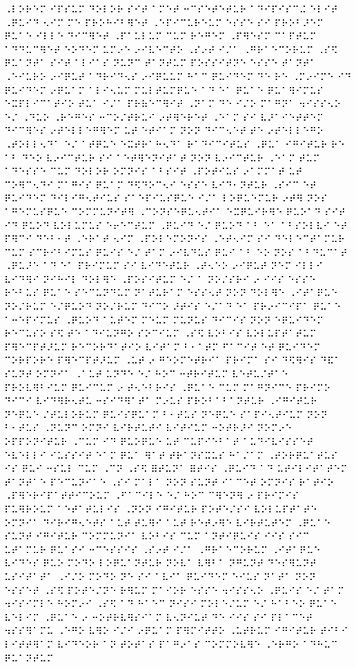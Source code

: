 \documentclass{scrartcl}
\begin{document}

\setmainfont{LouisLouis.ttf}



⠠⠇⠕⠗⠑⠍ ⠊⠏⠎⠥⠍ ⠙⠕⠇⠕⠗ ⠎⠊⠞ ⠁⠍⠑⠞ ⠒⠉⠎⠑⠞⠑⠞⠥⠗ ⠁⠙⠊⠏⠊⠎⠉⠬ ⠑⠇⠊⠞ ⠠⠟⠥⠊⠙ ⠢⠊⠍ ⠍⠑ ⠏⠗⠕⠓⠊⠃⠻⠑⠞ ⠠⠑⠏⠊⠉⠥⠗⠑⠥⠍ ⠑⠎⠎⠑ ⠎⠊ ⠏⠗⠕⠃⠜⠑⠍ ⠟⠥⠁⠑ ⠊⠇⠇⠑ ⠙⠊⠉⠻⠑⠞ ⠠⠏⠁⠥⠇⠥⠍ ⠉⠥⠍ ⠗⠑⠛⠑⠍ ⠠⠏⠻⠑⠎⠍ ⠉⠁⠏⠞⠥⠍ ⠁⠙⠙⠥⠉⠻⠑⠞ ⠑⠕⠙⠑⠍ ⠥⠍⠔⠑ ⠔⠊⠧⠑⠉⠞⠕ ⠠⠎⠔⠞ ⠊⠌⠁ ⠠⠛⠗⠁⠑⠉⠕⠗⠥⠍ ⠠⠎⠫ ⠟⠥⠁⠝⠞⠁ ⠎⠊⠞ ⠁⠇⠊⠁⠎ ⠝⠥⠝⠉ ⠞⠁⠝⠞⠥⠍ ⠏⠕⠎⠎⠊⠞⠝⠑ ⠑⠎⠎⠑ ⠞⠁⠝⠞⠁ ⠠⠑⠊⠥⠗⠕ ⠔⠊⠟⠥⠞ ⠁⠙⠗⠊⠙⠢⠎ ⠔⠊⠟⠥⠥⠍ ⠓⠁⠉ ⠟⠥⠊⠙⠑⠍ ⠙⠑ ⠗⠑ ⠠⠍⠔⠊⠍⠑ ⠊⠙ ⠟⠥⠊⠙⠑⠍ ⠔⠟⠥⠁⠍ ⠁⠇⠊⠢⠥⠍ ⠍⠥⠇⠞⠥⠍⠟⠥⠑ ⠁⠙ ⠑⠁ ⠟⠥⠁⠑ ⠟⠥⠁⠻⠊⠍⠥⠎ ⠑⠭⠏⠇⠊⠉⠁⠞⠊⠕ ⠞⠥⠁ ⠊⠌⠁ ⠏⠗⠷⠑⠉⠻⠊⠞ ⠠⠝⠁⠍ ⠙⠑ ⠊⠌⠕ ⠍⠁⠛⠝⠁ ⠲⠊⠎⠎⠢⠕ ⠑⠌ ⠠⠙⠥⠕ ⠠⠗⠑⠛⠑⠎ ⠒⠉⠕⠌⠞⠗⠥⠊ ⠔⠞⠻⠑⠗⠑⠞ ⠠⠑⠁⠍ ⠎⠊ ⠧⠜⠁⠊⠑⠞⠞⠑⠍ ⠙⠊⠉⠻⠑⠎ ⠔⠞⠑⠇⠇⠑⠛⠻⠑⠍ ⠥⠞ ⠑⠞⠊⠁⠍ ⠝⠕⠝ ⠙⠊⠉⠢⠑⠞ ⠞⠑ ⠔⠞⠑⠇⠇⠑⠛⠕ ⠠⠞⠕⠇⠇⠢⠙⠁ ⠑⠌ ⠁⠞⠟⠥⠑ ⠑⠭⠞⠗⠁⠓⠢⠙⠁ ⠗⠁⠙⠊⠉⠊⠞⠥⠎ ⠠⠟⠥⠁ ⠊⠛⠊⠞⠥⠗ ⠗⠑ ⠁⠃ ⠙⠑⠕ ⠧⠔⠊⠉⠞⠥⠗ ⠎⠊ ⠁⠑⠞⠻⠑⠝⠊⠞⠁⠞ ⠝⠕⠝ ⠧⠔⠊⠉⠞⠥⠗ ⠠⠑⠁⠍ ⠞⠥⠍ ⠁⠙⠑⠎⠎⠑ ⠉⠥⠍ ⠙⠕⠇⠕⠗ ⠕⠍⠝⠊⠎ ⠁⠃⠎⠊⠞ ⠠⠏⠕⠞⠊⠥⠎ ⠔⠁⠍⠍⠁⠞ ⠥⠞ ⠉⠕⠻⠉⠢⠙⠊ ⠍⠁⠛⠊⠎ ⠟⠥⠁⠍ ⠙⠫⠙⠕⠉⠢⠊ ⠑⠎⠎⠑ ⠧⠊⠙⠂⠝⠞⠥⠗ ⠠⠎⠊⠉ ⠑⠞ ⠟⠥⠊⠙⠑⠍ ⠙⠊⠇⠊⠛⠢⠞⠊⠥⠎ ⠎⠁⠑⠏⠊⠥⠎⠟⠥⠑ ⠊⠌⠁ ⠇⠕⠟⠥⠑⠍⠥⠗ ⠔⠞⠻ ⠝⠕⠎ ⠁⠛⠑⠍⠥⠎⠟⠥⠑ ⠉⠕⠍⠍⠥⠝⠊⠞⠻ ⠠⠉⠕⠝⠎⠑⠟⠥⠢⠞⠊⠁ ⠑⠭⠟⠥⠊⠗⠻⠑ ⠟⠥⠕⠁⠙ ⠎⠊⠞ ⠊⠙ ⠟⠥⠕⠙ ⠧⠕⠇⠥⠍⠥⠎ ⠑⠖⠑⠉⠞⠥⠍ ⠠⠟⠥⠊⠙ ⠑⠌ ⠟⠥⠕⠙ ⠁⠃ ⠑⠁ ⠁⠃⠎⠕⠇⠧⠊ ⠑⠞ ⠏⠻⠉⠊ ⠙⠑⠃⠂⠞ ⠠⠑⠗⠁⠞ ⠢⠊⠍ ⠠⠏⠕⠇⠑⠍⠕⠝⠊⠎ ⠠⠑⠞⠢⠊⠍ ⠎⠊ ⠙⠑⠇⠑⠉⠞⠁⠍⠥⠗ ⠉⠥⠍ ⠎⠉⠗⠊⠃⠊⠍⠥⠎ ⠟⠥⠊⠎ ⠑⠌ ⠞⠁⠍ ⠔⠊⠧⠙⠥⠎ ⠟⠥⠊ ⠁⠃ ⠑⠕ ⠝⠕⠎ ⠁⠃⠙⠥⠉⠁⠞ ⠠⠟⠥⠜⠑ ⠁⠙ ⠑⠁ ⠏⠗⠊⠍⠥⠍ ⠎⠊ ⠧⠊⠙⠑⠞⠥⠗ ⠠⠞⠢⠑⠕ ⠔⠊⠟⠥⠞ ⠝⠑⠍ ⠊⠇⠇⠊ ⠧⠊⠙⠻⠊ ⠝⠊⠓⠊⠇ ⠙⠕⠇⠻⠑ ⠠⠏⠕⠎⠊⠞⠥⠍ ⠑⠌ ⠁ ⠝⠕⠌⠎⠗⠊ ⠔ ⠊⠊⠎ ⠑⠎⠎⠑ ⠗⠑⠃⠥⠎ ⠟⠥⠁⠑ ⠎⠑⠉⠥⠝⠙⠥⠍ ⠝⠁⠞⠥⠗⠁⠍ ⠑⠎⠎⠢⠞ ⠝⠕⠝ ⠙⠕⠇⠻⠑ ⠠⠊⠞⠁⠟⠥⠑ ⠝⠕⠌⠗⠥⠍ ⠑⠌⠟⠥⠕⠙ ⠝⠕⠌⠗⠥⠍ ⠙⠊⠉⠕ ⠜⠞⠊⠎ ⠑⠌⠁⠙ ⠑⠁ ⠏⠗⠔⠊⠉⠊⠏⠁ ⠟⠥⠁⠑ ⠁⠒⠑⠏⠊⠍⠥⠎ ⠠⠟⠥⠕⠙ ⠁⠥⠞⠑⠍ ⠍⠑⠥⠍ ⠍⠥⠝⠥⠎ ⠙⠊⠉⠊⠎ ⠝⠕⠝ ⠑⠟⠥⠊⠙⠑⠍ ⠗⠑⠉⠥⠎⠕ ⠎⠫ ⠞⠑ ⠁⠙⠊⠥⠝⠛⠕ ⠎⠕⠉⠊⠥⠍ ⠠⠎⠫ ⠧⠕⠃⠊⠎ ⠧⠕⠇⠥⠏⠞⠁⠞⠥⠍ ⠏⠻⠑⠉⠏⠞⠜⠥⠍ ⠗⠑⠉⠕⠗⠙⠁⠞⠊⠕ ⠧⠊⠞⠁⠍ ⠃⠂⠁⠞⠍ ⠋⠁⠉⠊⠞ ⠑⠞ ⠟⠥⠊⠙⠑⠍ ⠉⠕⠗⠏⠕⠗⠑ ⠏⠻⠑⠉⠏⠞⠜⠥⠍ ⠠⠥⠞ ⠔ ⠛⠑⠕⠍⠑⠞⠗⠊⠁ ⠏⠗⠊⠍⠁ ⠎⠊ ⠙⠫⠻⠊⠎ ⠙⠯⠁ ⠎⠥⠝⠞ ⠕⠍⠝⠊⠁ ⠠⠁⠥⠞ ⠥⠝⠙⠑ ⠑⠌ ⠓⠕⠉ ⠒⠞⠗⠊⠞⠥⠍ ⠧⠑⠞⠥⠌⠞⠁⠑ ⠏⠗⠕⠧⠻⠃⠊⠥⠍ ⠟⠥⠊⠉⠥⠍ ⠔ ⠞⠢⠑⠃⠗⠊⠎ ⠠⠟⠥⠁⠑ ⠉⠥⠍ ⠍⠁⠛⠝⠊⠉⠑ ⠏⠗⠊⠍⠕ ⠙⠊⠉⠊ ⠧⠊⠙⠻⠗⠢⠞⠥ ⠒⠎⠊⠙⠻⠁⠞⠁ ⠍⠔⠥⠎ ⠏⠗⠕⠃⠁⠃⠁⠝⠞⠥⠗ ⠠⠊⠛⠊⠞⠥⠗ ⠝⠑⠟⠥⠑ ⠌⠞⠥⠇⠕⠗⠥⠍ ⠟⠥⠊⠎⠟⠥⠁⠍ ⠃⠂⠞⠥⠎ ⠝⠑⠟⠥⠑ ⠎⠁⠏⠊⠢⠞⠊⠥⠍ ⠝⠕⠝ ⠃⠂⠞⠥⠎ ⠠⠝⠥⠝⠉ ⠕⠍⠝⠊ ⠧⠊⠗⠞⠥⠞⠊ ⠧⠊⠞⠊⠥⠍ ⠒⠕⠞⠗⠜⠊ ⠝⠕⠍⠔⠑ ⠕⠏⠏⠕⠝⠊⠞⠥⠗ ⠠⠉⠥⠍ ⠊⠙ ⠟⠥⠕⠟⠥⠑ ⠥⠞ ⠉⠥⠏⠊⠑⠃⠁⠞ ⠁⠥⠙⠊⠧⠊⠎⠎⠑⠞ ⠑⠧⠑⠇⠇⠊ ⠊⠥⠎⠎⠊⠞ ⠑⠁⠍ ⠟⠥⠁ ⠻⠁⠞ ⠞⠗⠁⠝⠎⠭⠥⠎ ⠓⠁⠌⠁⠍ ⠠⠞⠕⠗⠟⠥⠁⠞⠥⠎ ⠊⠎ ⠟⠥⠊ ⠒⠎⠥⠇ ⠉⠥⠍ ⠠⠉⠝ ⠠⠎⠫ ⠿⠞⠥⠝⠁ ⠿⠞⠊⠎ ⠠⠟⠥⠊⠙ ⠁⠙ ⠥⠞⠊⠇⠊⠞⠁⠞⠑⠍ ⠞⠁⠝⠞⠁⠑ ⠏⠑⠉⠥⠝⠊⠁⠑ ⠠⠎⠊ ⠍⠁⠇⠁ ⠝⠕⠝ ⠎⠥⠝⠞ ⠊⠁⠉⠑⠞ ⠕⠍⠝⠊⠎ ⠗⠁⠞⠊⠕ ⠠⠏⠻⠑⠗⠊⠏⠁⠞⠞⠊⠉⠕⠥⠍ ⠠⠋⠁⠉⠊⠇⠑ ⠑⠌ ⠓⠕⠉ ⠉⠻⠑⠝⠻ ⠔ ⠏⠗⠊⠍⠊⠎ ⠏⠥⠻⠗⠕⠥⠍ ⠁⠑⠞⠁⠞⠥⠇⠊⠎ ⠠⠝⠕⠝ ⠊⠛⠊⠞⠥⠗ ⠏⠕⠞⠑⠌⠎⠊ ⠧⠕⠇⠥⠏⠞⠁⠞⠑ ⠕⠍⠝⠊⠁ ⠙⠊⠗⠊⠛⠢⠑⠞⠎ ⠁⠥⠞ ⠞⠥⠻⠊ ⠁⠥⠞ ⠗⠑⠞⠔⠻⠑ ⠧⠊⠗⠞⠥⠞⠑⠍ ⠠⠟⠥⠁⠑ ⠎⠥⠝⠞ ⠊⠛⠊⠞⠥⠗ ⠉⠕⠍⠍⠥⠝⠊⠁ ⠧⠕⠃⠊⠎ ⠉⠥⠍ ⠁⠝⠞⠊⠟⠥⠊⠎ ⠊⠊⠎ ⠎⠊⠉ ⠥⠞⠁⠍⠥⠗ ⠟⠥⠁⠎⠊ ⠒⠉⠑⠎⠎⠊⠎ ⠠⠎⠔⠞ ⠊⠌⠁ ⠠⠛⠗⠁⠑⠉⠕⠗⠥⠍ ⠠⠊⠞⠁⠟⠥⠑ ⠧⠊⠙⠑⠎ ⠟⠥⠕ ⠍⠕⠙⠕ ⠇⠕⠟⠥⠁⠝⠞⠥⠗ ⠝⠕⠧⠁ ⠧⠻⠃⠁ ⠝⠛⠥⠝⠞ ⠙⠑⠎⠻⠥⠝⠞ ⠥⠎⠊⠞⠁⠞⠁ ⠠⠊⠌⠕ ⠍⠕⠙⠕ ⠝⠑ ⠎⠊ ⠁⠧⠊⠁ ⠟⠥⠊⠙⠑⠍ ⠑⠊⠥⠎ ⠝⠁⠞⠁ ⠝⠕⠝ ⠑⠎⠎⠑⠞ ⠠⠎⠫ ⠏⠕⠞⠑⠌⠝⠑ ⠗⠻⠥⠍ ⠍⠁⠊⠕⠗ ⠑⠎⠎⠑ ⠲⠊⠎⠎⠢⠕ ⠠⠟⠥⠊⠎ ⠑⠌ ⠞⠁⠍ ⠲⠊⠎⠊⠍⠇⠑ ⠓⠕⠍⠔⠊ ⠠⠎⠫ ⠁⠙ ⠓⠁⠑⠉ ⠝⠊⠎⠊ ⠍⠕⠇⠑⠌⠥⠍ ⠑⠌ ⠓⠁⠃⠑⠕ ⠟⠥⠁⠑ ⠧⠑⠇⠊⠍ ⠠⠟⠥⠁⠑ ⠔ ⠒⠕⠞⠗⠧⠻⠎⠊⠁⠍ ⠧⠢⠝⠊⠥⠞ ⠙⠑ ⠊⠊⠎ ⠎⠊ ⠏⠇⠁⠉⠑⠞ ⠲⠎⠎⠻⠁⠍⠥ ⠠⠑⠛⠕ ⠧⠻⠕ ⠊⠌⠊ ⠔⠟⠥⠁⠍ ⠏⠻⠍⠊⠞⠞⠕ ⠠⠥⠞⠗⠥⠍ ⠊⠛⠊⠞⠥⠗ ⠞⠊⠃⠊ ⠇⠊⠞⠞⠻⠁⠍ ⠧⠊⠙⠑⠕⠗ ⠁⠝ ⠞⠕⠞⠁⠎ ⠏⠁⠛⠔⠁⠎ ⠉⠕⠍⠍⠕⠧⠻⠑ ⠠⠑⠗⠛⠕ ⠁⠙⠓⠥⠉ ⠟⠥⠁⠝⠞⠥⠍ 
\end{document}
